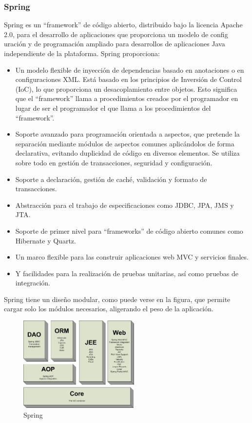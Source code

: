 \documentclass[12pt, a4paper, twoside]{book}
\begin{document}
	\subsubsection{Spring}
	Spring es un “framework” de código abierto, distribuido bajo la licencia Apache
	2.0, para el desarrollo de aplicaciones que proporciona un modelo de config uración y de
	programación ampliado para desarrollos de aplicaciones Java independiente de la
	plataforma. Spring proporciona:
	\begin{itemize}
		\item Un modelo flexible de inyección de dependencias basado en anotaciones o en
		configuraciones XML. Está basado en los principios de Inversión de Control
		(IoC), lo que proporciona un desacoplamiento entre objetos. Esto significa que
		el “framework” llama a procedimientos creados por el programador en lugar de
		ser el programador el que llama a los procedimientos del “framework”.
		\item Soporte avanzado para programación orientada a aspectos, que pretende la
		separación mediante módulos de aspectos comunes aplicándolos de forma
		declarativa, evitando duplicidad de código en diversos elementos. Se utiliza
		sobre todo en gestión de transacciones, seguridad y configuración.
		\item Soporte a declaración, gestión de caché, validación y formato de transacciones.
		\item Abstracción para el trabajo de especificaciones como JDBC, JPA, JMS y JTA.
		\item Soporte de primer nivel para “frameworks” de código abierto comunes como
		Hibernate y Quartz.
		\item Un marco flexible para las construir aplicaciones web MVC y servicios finales.
		\item Y facilidades para la realización de pruebas unitarias, así como pruebas de
		integración.
		
	\end{itemize}
	Spring tiene un diseño modular, como puede verse en la figura, que
	permite cargar solo los módulos necesarios, aligerando el peso de la aplicación.\cite{Spring}
	
	\begin{figure}[H]
		\centering
		\includegraphics[width=6cm]{Imagenes/spring.png}
		\caption{Spring}\label{spring}
	\end{figure}
\end{document}
